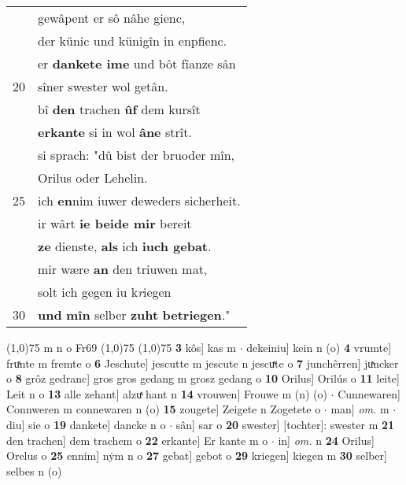\documentclass[8pt,a4paper,notitlepage]{article}
\begin{document}
\begin{table}[ht]
\begin{minipage}[t]{0.5\linewidth}
\begin{tabular}{rl}
 & gewâpent er sô nâhe gienc,\\ 
 & der künic und künigîn in enpfienc.\\ 
 & er \textbf{dankete ime} und bôt fîanze sân\\ 
20 & sîner swester wol getân.\\ 
 & bî \textbf{den} trachen \textbf{ûf} dem kursît\\ 
 & \textbf{erkante} si in wol \textbf{âne} strît.\\ 
 & si sprach: "dû bist der bruoder mîn,\\ 
 & Orilus oder Lehelin.\\ 
25 & ich \textbf{en}nim iuwer deweders sicherheit.\\ 
 & ir wârt \textbf{ie beide mir} bereit\\ 
 & \textbf{ze} dienste, \textbf{als} ich \textbf{iuch gebat}.\\ 
 & mir wære \textbf{an} den triuwen mat,\\ 
 & solt ich gegen iu k\textit{r}iegen\\ 
30 & \textbf{und} \textbf{mîn} selber \textbf{zuht} \textbf{betriegen}."\\ 
\end{tabular}
\scriptsize
\line(1,0){75} \newline
m n o Fr69 \newline
\line(1,0){75} \newline
\newline
\line(1,0){75} \newline
\textbf{3} kôs] kas m  $\cdot$ dekeiniu] kein n (o) \textbf{4} vrumte] fruͯnte m fremte o \textbf{6} Jeschute] jescutte m jescute n jescuͯte o \textbf{7} junchêrren] juͯncker o \textbf{8} grôz gedranc] gros gros gedang m grosz gedang o \textbf{10} Orilus] Orilús o \textbf{11} leite] Leit n o \textbf{13} alle zehant] alzuͯ hant n \textbf{14} vrouwen] Frouwe m (n) (o)  $\cdot$ Cunnewaren] Connweren m connewaren n (o) \textbf{15} zougete] Zeigete n Zogetete o  $\cdot$ man] \textit{om.} m  $\cdot$ diu] sie o \textbf{19} dankete] dancke n o  $\cdot$ sân] sar o \textbf{20} swester] [tochter]: swester m \textbf{21} den trachen] dem trachem o \textbf{22} erkante] Er kante m o  $\cdot$ in] \textit{om.} n \textbf{24} Orilus] Orelus o \textbf{25} ennim] nẏm n o \textbf{27} gebat] gebot o \textbf{29} kriegen] kiegen m \textbf{30} selber] selbes n (o) \newline
\end{minipage}
\end{table}
\newpage
\end{document}

